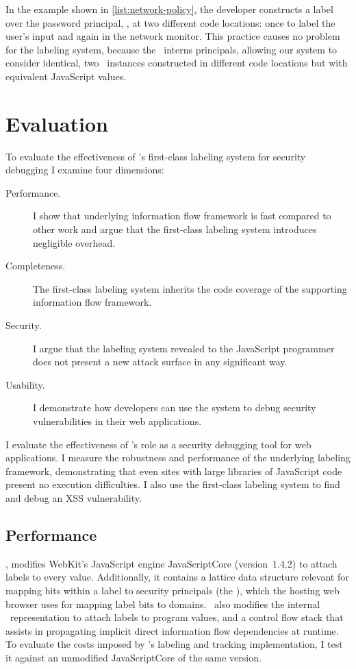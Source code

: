 In the example shown in \autoref{list:network-policy}, the developer constructs a label over the password principal, , at two different code locations: once to label the user's input and again in the network monitor.
This practice causes no problem for the labeling system, because the \FlowLabelRegistry\ interns principals, allowing our system to consider identical, two \FlowLabelObject\ instances constructed in different code locations but with equivalent JavaScript values.

\section{Evaluation}
\label{sec:first-class-evaluation}

To evaluate the effectiveness of \FlowCore's first-class labeling system for security debugging I examine four dimensions:
\begin{description}
\item[Performance.] I show that underlying information flow framework is fast compared to other work and argue that the first-class labeling system introduces negligible overhead.
\item[Completeness.] The first-class labeling system inherits the code coverage of the supporting information flow framework.
\item[Security.] I argue that the labeling system revealed to the JavaScript programmer does not present a new attack surface in any significant way.
\item[Usability.] I demonstrate how developers can use the system to debug security vulnerabilities in their web applications.
\end{description}

I evaluate the effectiveness of \FlowCore's role as a security debugging tool for web applications.
I measure the robustness and performance of the underlying labeling framework, demonstrating that even sites with large libraries of JavaScript code present no execution difficulties.
I also use the first-class labeling system to find and debug an XSS vulnerability.

\subsection{Performance}
\label{sec:first-class-performance}

\FlowCore, modifies WebKit's JavaScript engine JavaScriptCore (version~1.4.2) to attach labels to every value.
Additionally, it contains a lattice data structure relevant for mapping bits within a label to security principals (the \FlowLabelRegistry), which the hosting web browser uses for mapping label bits to domains.
\FlowCore\ also modifies the internal \JSValue\ representation to attach labels to program values, and a control flow stack that assists in propagating implicit direct information flow dependencies at runtime.
To evaluate the costs imposed by \FlowCore's labeling and tracking implementation, I test it against an unmodified JavaScriptCore of the same version.

